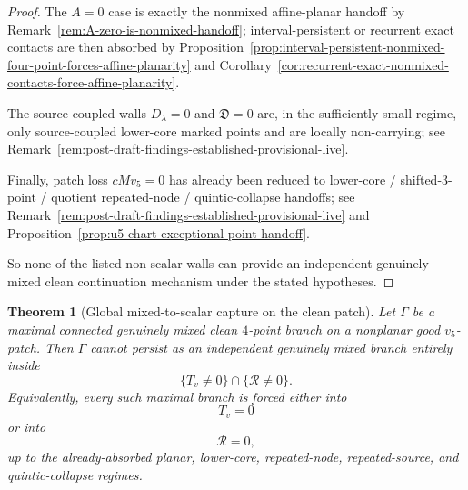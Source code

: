 \documentclass[11pt,a4paper]{amsart}
\theoremstyle{plain}
\newtheorem{theorem}{Theorem}[section]
\theoremstyle{definition}
\begin{document}
\begin{proof}
The $A=0$ case is exactly the nonmixed affine-planar handoff by
Remark~\ref{rem:A-zero-is-nonmixed-handoff}; interval-persistent or recurrent
exact contacts are then absorbed by
Proposition~\ref{prop:interval-persistent-nonmixed-four-point-forces-affine-planarity}
and Corollary~\ref{cor:recurrent-exact-nonmixed-contacts-force-affine-planarity}.

The source-coupled walls $D_\lambda=0$ and $\mathfrak D=0$ are, in the
sufficiently small regime, only source-coupled lower-core marked points and are
locally non-carrying; see
Remark~\ref{rem:post-draft-findings-established-provisional-live}.

Finally, patch loss $cMv_5=0$ has already been reduced to lower-core /
shifted-$3$-point / quotient repeated-node / quintic-collapse handoffs; see
Remark~\ref{rem:post-draft-findings-established-provisional-live} and
Proposition~\ref{prop:u5-chart-exceptional-point-handoff}.

So none of the listed non-scalar walls can provide an independent genuinely
mixed clean continuation mechanism under the stated hypotheses.
\end{proof}

\begin{theorem}[Global mixed-to-scalar capture on the clean patch]
\label{thm:global-mixed-to-scalar-capture-clean-patch}
Let $\Gamma$ be a maximal connected genuinely mixed clean $4$-point branch on a
nonplanar good $v_5$-patch. Then $\Gamma$ cannot persist as an independent
genuinely mixed branch entirely inside
\[
\{T_v\neq 0\}\cap\{\mathcal R\neq 0\}.
\]
Equivalently, every such maximal branch is forced either into
\[
T_v=0
\]
or into
\[
\mathcal R=0,
\]
up to the already-absorbed planar, lower-core, repeated-node, repeated-source,
and quintic-collapse regimes.
\end{theorem}
\end{document}
